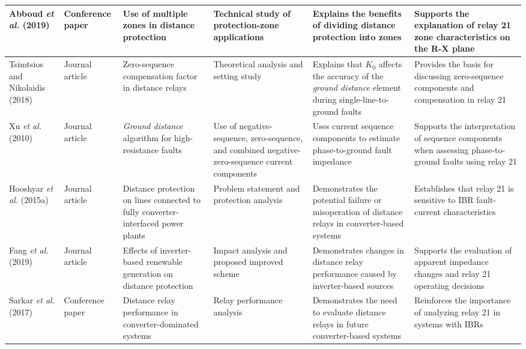 \begin{longtable}{|p{}|p{}|p{}|p{}|p{}|p{}|}
    Abboud \textit{et al.} (2019) \cite{abboud2019fivezones} & Conference paper & Use of multiple zones in distance protection & Technical study of protection-zone applications & Explains the benefits of dividing distance protection into zones & Supports the explanation of relay 21 zone characteristics on the R-X plane \\ \hline

    Tsimtsios and Nikolaidis (2018) \cite{tsimtsios2018setting} & Journal article & Zero-sequence compensation factor in distance relays & Theoretical analysis and setting study & Explains that \(K_0\) affects the accuracy of the \textit{ground distance} element during single-line-to-ground faults & Provides the basis for discussing zero-sequence components and compensation in relay 21 \\ \hline

    Xu \textit{et al.} (2010) \cite{xu2010ground} & Journal article & \textit{Ground distance} algorithm for high-resistance faults & Use of negative-sequence, zero-sequence, and combined negative-zero-sequence current components & Uses current sequence components to estimate phase-to-ground fault impedance & Supports the interpretation of sequence components when assessing phase-to-ground faults using relay 21 \\ \hline

    Hooshyar \textit{et al.} (2015a) \cite{hooshyar2015cirepp1} & Journal article & Distance protection on lines connected to fully converter-interfaced power plants & Problem statement and protection analysis & Demonstrates the potential failure or misoperation of distance relays in converter-based systems & Establishes that relay 21 is sensitive to IBR fault-current characteristics \\ \hline

    Fang \textit{et al.} (2019) \cite{fang2019impact} & Journal article & Effects of inverter-based renewable generation on distance protection & Impact analysis and proposed improved scheme & Demonstrates changes in distance relay performance caused by inverter-based sources & Supports the evaluation of apparent impedance changes and relay 21 operating decisions \\ \hline

    Sarkar \textit{et al.} (2017) \cite{sarkar2017distance_relay_future} & Conference paper & Distance relay performance in converter-dominated systems & Relay performance analysis & Demonstrates the need to evaluate distance relays in future converter-based systems & Reinforces the importance of analyzing relay 21 in systems with IBRs \\ \hline


\end{longtable}
